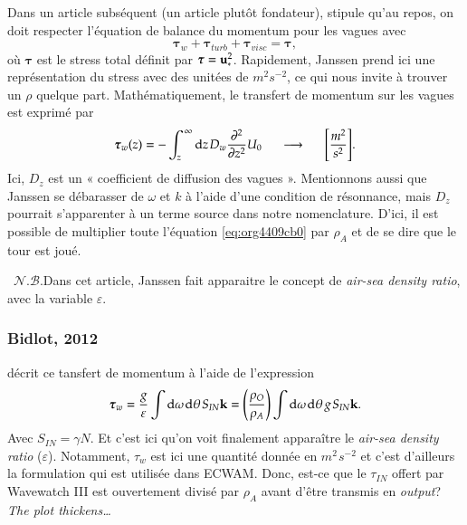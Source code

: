 \documentclass[10pt]{article}
\numberwithin{equation}{section}
\newcommand{\uu}{\vb{u}}
\newcommand{\pt}{\hspace{1pt}} %
\newcommand{\nb}{\raisebox{0.8pt}{\scriptsize\textleaf}\ $\mathscr{N. B.}$\hspace{4pt}}
\begin{document}
Dans un article subséquent (un article plutôt fondateur), \citet*[voir eq. 7 et 8 de l'article]{janssen_1991}  stipule qu'au repos, on doit respecter l'équation de balance du momentum pour les vagues avec
\begin{equation}
\label{eq:org4409cb0}
   \boldsymbol{\tau}_w + \boldsymbol{\tau}_{turb} + \boldsymbol{\tau}_{visc}  = \boldsymbol{\tau},
\end{equation}
où \(\boldsymbol{\tau}\) est le stress total définit par \(\boldsymbol{\tau} = \uu_*^2\).
Rapidement, Janssen prend ici une représentation du stress avec des unitées de \(m^{2} s^{-2}\), ce qui nous invite à trouver un \(\rho\) quelque part.
Mathématiquement, le transfert de momentum sur les vagues est exprimé par
\begin{equation}
   \boldsymbol{\tau}_w(z) = - \int_z^{\pt\infty} \mathrm{d}z\pt D_w \pdv[2]{}{z} U_0 \hspace{0.5cm} \longrightarrow \hspace{0.5cm} \qty[\frac{m^2}{s^2}].
\end{equation}
Ici, \(D_z\) est un « coefficient de diffusion des vagues ».
Mentionnons aussi que Janssen se débarasser de \(\omega\) et \(k\) à l'aide d'une condition de résonnance, mais \(D_z\) pourrait s'apparenter à un terme source dans notre nomenclature.
D'ici, il est possible de multiplier toute l'équation \ref{eq:org4409cb0} par \(\rho_A\) et de se dire que le tour est joué.\bigskip

\nb Dans cet article, Janssen fait apparaitre le concept de \emph{air-sea density ratio}, avec la variable \(\varepsilon\).


\subsubsection{Bidlot, 2012}
\label{sec:orgbad60e5}

 décrit ce tansfert de momentum à l'aide de l'expression
\begin{equation}
   \boldsymbol{\tau}_w = \frac{g}{\varepsilon} \int \mathrm{d}\omega\pt \mathrm{d}\theta\pt S_{IN} \vb{k} = \qty(\frac{\rho_O}{\rho_A}) \int \mathrm{d}\omega\pt \mathrm{d}\theta\pt g\pt S_{IN} \vb{k}.
\end{equation}
Avec \(S_{IN} = \gamma N\).
Et c'est ici qu'on voit finalement apparaître le \emph{air-sea density ratio} (\(\varepsilon\)).
Notamment, \(\tau_w\) est ici une quantité donnée en \(m^2\pt s^{-2}\) et c'est d'ailleurs la formulation qui est utilisée dans ECWAM.
Donc, est-ce que le \(\tau_{IN}\) offert par Wavewatch III est ouvertement divisé par \(\rho_A\) avant d'être transmis en \emph{output}?
\emph{The plot thickens\ldots{}}
\end{document}
